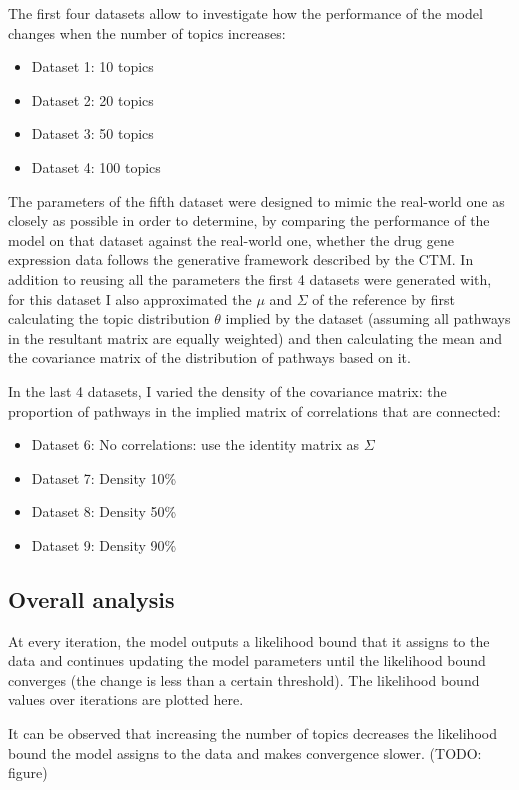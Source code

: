 \documentclass[12pt,a4paper,twoside,openright]{report}
\begin{document}
The first four datasets allow to investigate how the performance of the model changes when the number of topics increases:

\begin{itemize}[noitemsep]
\item Dataset 1: 10 topics
\item Dataset 2: 20 topics
\item Dataset 3: 50 topics
\item Dataset 4: 100 topics
\end{itemize}

The parameters of the fifth dataset were designed to mimic the real-world one as closely as possible in order to determine, by comparing the performance of the model on that dataset against the real-world one, whether the drug gene expression data follows the generative framework described by the CTM. In addition to reusing all the parameters the first 4 datasets were generated with, for this dataset I also approximated the $\mu$ and $\Sigma$ of the reference by first calculating the topic distribution $\theta$ implied by the dataset (assuming all pathways in the resultant matrix are equally weighted) and then calculating the mean and the covariance matrix of the distribution of pathways based on it.

In the last 4 datasets, I varied the density of the covariance matrix: the proportion of pathways in the implied matrix of correlations that are connected:

\begin{itemize}[noitemsep]
\item Dataset 6: No correlations: use the identity matrix as $\Sigma$
\item Dataset 7: Density 10\%
\item Dataset 8: Density 50\%
\item Dataset 9: Density 90\%
\end{itemize}

\subsection{Overall analysis}

At every iteration, the model outputs a likelihood bound that it assigns to the data and continues updating the model parameters until the likelihood bound converges (the change is less than a certain threshold). The likelihood bound values over iterations are plotted here.

It can be observed that increasing the number of topics decreases the likelihood bound the model assigns to the data and makes convergence slower. (TODO: figure)
\end{document}
